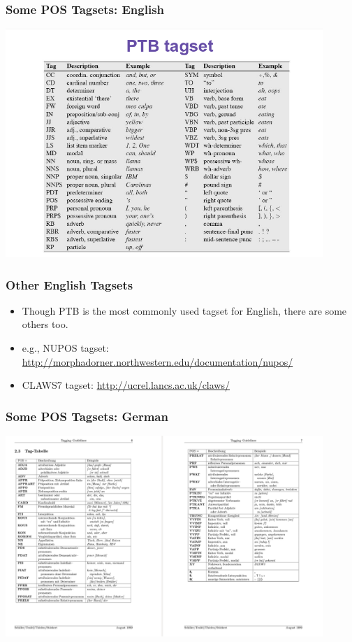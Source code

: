 \documentclass{beamer}
\begin{document}
\begin{frame}
\frametitle{Some POS Tagsets: English}
\includegraphics[width=0.9\textwidth]{posenglish.png}
\end{frame}

\begin{frame}
\frametitle{Other English Tagsets}
\begin{itemize}
\item Though PTB is the most commonly used tagset for English, there are some others too.
\item e.g., NUPOS tagset: \url{http://morphadorner.northwestern.edu/documentation/nupos/}
\item CLAWS7 tagset: \url{http://ucrel.lancs.ac.uk/claws/}
\end{itemize}
\end{frame}

\begin{frame}
\frametitle{Some POS Tagsets: German}
\includegraphics[width=0.9\textwidth]{posgerman.png}
\end{frame}
\end{document}
